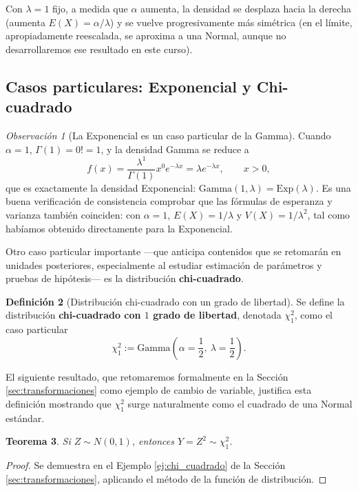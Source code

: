 \documentclass[11pt,a4paper]{article}
\theoremstyle{plain}
\newtheorem{teorema}{Teorema}[section]
\theoremstyle{definition}
\newtheorem{definicion}[teorema]{Definición}
\theoremstyle{remark}
\newtheorem{observacion}[teorema]{Observación}
\begin{document}
Con $\lambda=1$ fijo, a medida que $\alpha$ aumenta, la densidad se desplaza hacia la derecha (aumenta $E(X)=\alpha/\lambda$) y se vuelve progresivamente más simétrica (en el límite, apropiadamente reescalada, se aproxima a una Normal, aunque no desarrollaremos ese resultado en este curso).

\subsection{Casos particulares: Exponencial y Chi-cuadrado}

\begin{observacion}[La Exponencial es un caso particular de la Gamma]
Cuando $\alpha=1$, $\Gamma(1)=0!=1$, y la densidad Gamma se reduce a
$$f(x)=\frac{\lambda^1}{\Gamma(1)}x^{0}e^{-\lambda x}=\lambda e^{-\lambda x},\qquad x>0,$$
que es exactamente la densidad Exponencial: $\text{Gamma}(1,\lambda)=\text{Exp}(\lambda)$. Es una buena verificación de consistencia comprobar que las fórmulas de esperanza y varianza también coinciden: con $\alpha=1$, $E(X)=1/\lambda$ y $V(X)=1/\lambda^2$, tal como habíamos obtenido directamente para la Exponencial.
\end{observacion}

Otro caso particular importante —que anticipa contenidos que se retomarán en unidades posteriores, especialmente al estudiar estimación de parámetros y pruebas de hipótesis— es la distribución \textbf{chi-cuadrado}.

\begin{definicion}[Distribución chi-cuadrado con un grado de libertad]
Se define la distribución \textbf{chi-cuadrado con $1$ grado de libertad}, denotada $\chi^2_1$, como el caso particular
$$\chi^2_1:=\text{Gamma}\left(\alpha=\frac12,\ \lambda=\frac12\right).$$
\end{definicion}

El siguiente resultado, que retomaremos formalmente en la Sección \ref{sec:transformaciones} como ejemplo de cambio de variable, justifica esta definición mostrando que $\chi^2_1$ surge naturalmente como el cuadrado de una Normal estándar.

\begin{teorema}
Si $Z\sim N(0,1)$, entonces $Y=Z^2\sim\chi^2_1$.
\end{teorema}
\begin{proof}
Se demuestra en el Ejemplo \ref{ej:chi_cuadrado} de la Sección \ref{sec:transformaciones}, aplicando el método de la función de distribución.
\end{proof}
\end{document}
